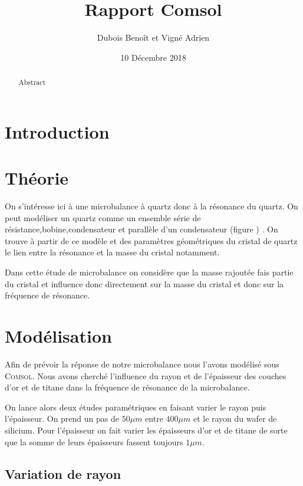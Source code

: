 \documentclass[a4paper,10pt]{article}
\title{Rapport Comsol}
\author{Dubois Benoît et Vigné Adrien}
\date{10 Décembre 2018}
\begin{document}
\maketitle

\begin{abstract}
    Abstract
\end{abstract}

\begin{multicols}{2}

\section*{Introduction}

\section{Théorie}
On s'intéresse ici à une microbalance à quartz donc à la résonance du quartz. On peut modéliser un quartz comme un ensemble série de résistance,bobine,condensateur et parallèle d'un condensateur (figure ) . On trouve à partir de ce modèle et des paramètres géométriques du cristal de quartz le lien entre la résonance et la masse du cristal notamment.
$$  $$

Dans cette étude de microbalance on considère que la masse rajoutée fais partie du cristal et influence donc directement sur la masse du cristal et donc sur la fréquence de résonance.




\section{Modélisation}

Afin de prévoir la réponse de notre microbalance nous l'avons modélisé sous \textsc{Comsol}. Nous avons cherché l'influence du rayon et de l'épaisseur des couches d'or et de titane dans la fréquence de résonance de la microbalance. 

On lance alors deux études paramétriques en faisant varier le rayon puis l'épaisseur. On prend un pas de $50 \mu m$ entre $400 \mu m$ et le rayon du wafer de silicium. Pour l'épaisseur on fait varier les épaisseurs d'or et de titane de sorte que la somme de leurs épaisseurs fassent toujours $1 \mu m$.

\subsection{Variation de rayon}


\end{multicols}
\end{document}
